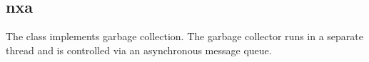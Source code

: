 %
%
%
%
%              

\subsection{nxa}
\label{nxa}

The  class implements garbage collection.  The garbage collector
runs in a separate thread and is controlled via an asynchronous message queue.

